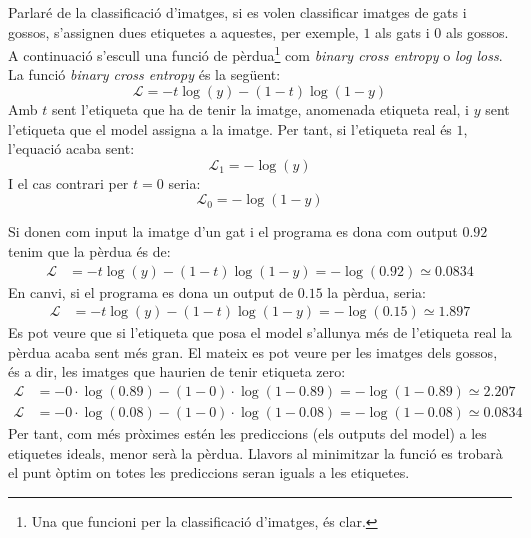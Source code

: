 Parlaré de la classificació d'imatges, si es volen classificar imatges de gats i gossos, s'assignen dues etiquetes a aquestes, per exemple, $1$ als gats i $0$ als gossos. A continuació s'escull una funció de pèrdua\footnote{Una que funcioni per la classificació d'imatges, és clar.} com \textit{binary cross entropy} o \textit{log loss}. La funció \textit{binary cross entropy} és la següent:
\begin{equation}
	\mathcal{L} = - t\log(y) - (1 - t)\log(1 - y) 
	\label{eq:BCE}
\end{equation}
Amb $t$ sent l'etiqueta que ha de tenir la imatge, anomenada etiqueta real, i $y$ sent l'etiqueta que el model assigna a la imatge. Per tant, si l'etiqueta real és $1$, l'equació acaba sent:
$$
\mathcal{L}_1 = - \log(y)
$$
I el cas contrari per $t = 0$ seria:
$$
\mathcal{L}_0 = - \log(1 - y)
$$

Si donen com input la imatge d'un gat i el programa es dona com output $0.92$ tenim que la pèrdua és de:
\begin{align*}
	\mathcal{L} &= - t\log(y) - (1 - t)\log(1 - y) = - \log(0.92) \simeq 0.0834
\end{align*}
En canvi, si el programa es dona un output de $0.15$ la pèrdua, seria:
\begin{align*}
	\mathcal{L} &= - t\log(y) - (1 - t)\log(1 - y) = - \log(0.15) \simeq 1.897
\end{align*}
Es pot veure que si l'etiqueta que posa el model s'allunya més de l'etiqueta real la pèrdua acaba sent més gran. El mateix es pot veure per les imatges dels gossos, és a dir, les imatges que haurien de tenir etiqueta zero:
\begin{align*}
	\mathcal{L} &= - 0\cdot\log(0.89) - (1 - 0)\cdot\log(1 - 0.89) = - \log(1- 0.89) \simeq 2.207 \\
	\mathcal{L} &= - 0\cdot\log(0.08) - (1 - 0)\cdot\log(1 - 0.08) = - \log(1- 0.08)\simeq 0.0834
\end{align*}
Per tant, com més pròximes estén les prediccions (els outputs del model) a les etiquetes ideals, menor serà la pèrdua. Llavors al minimitzar la funció es trobarà el punt òptim on totes les prediccions seran iguals a les etiquetes.

